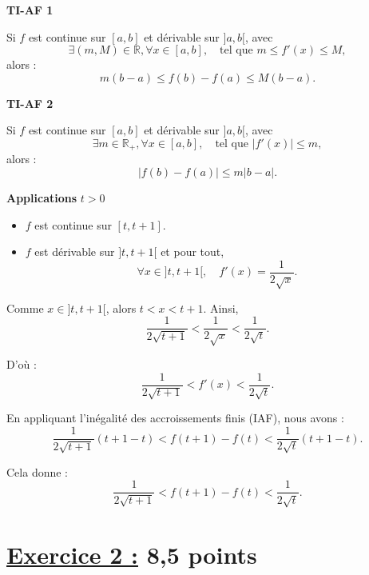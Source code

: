 \documentclass[12pt,a4paper]{article}
\begin{document}
\begin{enumerate}
\textbf{TI-AF 1}

Si $f$ est continue sur $[a, b]$ et dérivable sur $]a, b[$, avec 
\[
\exists (m, M) \in \mathbb{R}, \forall x \in [a, b], \quad \text{tel que } m \leq f'(x) \leq M,
\]
alors :
\[
m(b-a) \leq f(b) - f(a) \leq M(b-a).
\]

\textbf{TI-AF 2}

Si $f$ est continue sur $[a, b]$ et dérivable sur $]a, b[$, avec 
\[
\exists m \in \mathbb{R}_{+}, \forall x \in [a, b], \quad \text{tel que } |f'(x)| \leq m,
\]
alors :
\[
|f(b) - f(a)| \leq m|b-a|.
\]

\newpage
\textbf{Applications} $t > 0$

\begin{itemize}
    \item $f$ est continue sur $[t, t+1]$.
    \item $f$ est dérivable sur $]t, t+1[$ et pour tout,
\[
    \forall x \in ]t, t+1[, \quad f'(x) = \frac{1}{2\sqrt{x}}.
\]
\end{itemize}

Comme $x \in ]t, t+1[$, alors $t < x < t+1$. Ainsi, 
\[
\frac{1}{2\sqrt{t+1}} < \frac{1}{2\sqrt{x}} < \frac{1}{2\sqrt{t}}.
\]

D'où :
\[
\frac{1}{2\sqrt{t+1}} < f'(x) < \frac{1}{2\sqrt{t}}.
\]

En appliquant l'inégalité des accroissements finis (IAF), nous avons :
\[
\frac{1}{2\sqrt{t+1}}(t+1-t) < f(t+1) - f(t) < \frac{1}{2\sqrt{t}}(t+1-t).
\]

Cela donne :
\[
\frac{1}{2\sqrt{t+1}} < f(t+1) - f(t) < \frac{1}{2\sqrt{t}}.
\]

\end{enumerate}

\section*{\underline{Exercice 2 :} 8,5 points}
\end{document}
